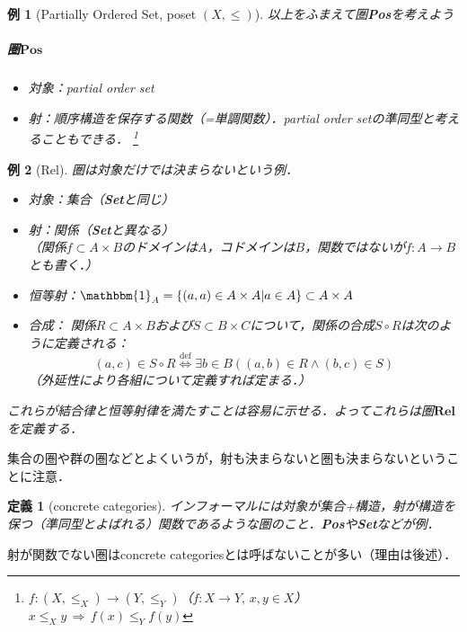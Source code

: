 \documentclass[dvipdfmx,a4j,10pt]{jsarticle}
\theoremstyle{mystyle1}
\theoremstyle{mystyle2}
\newtheorem{dfn*}{定義}
\newtheorem{example}{例}
\newcommand{\defLeftrightarrow}{\overset{\text{def}}{\iff}}
\begin{document}
\begin{example}[Partially Ordered Set, poset $(X,\leq)$]
	以上をふまえて圏\textbf{Pos}を考えよう

	\subparagraph{圏$\mathbf{Pos}$}
	\begin{itemize}
		\item 対象：partial order set
		\item 射：順序構造を保存する関数（=単調関数）．partial order setの準同型と考えることもできる．
		      \footnote{$f:(X,\leq_X)\to (Y,\leq_Y)$（$f:X\to Y,\, x,y\in X$）$x\leq_X y\,\Rightarrow\,f(x)\leq_Y f(y)$}
	\end{itemize}
\end{example}

\begin{example}[Rel]
	圏は対象だけでは決まらないという例．
	\begin{itemize}
		\item 対象：集合（\textbf{Set}と同じ）
		\item 射：関係（\textbf{Set}と異なる）\\
		      （関係$f\subset A\times B$のドメインは$A$，コドメインは$B$，関数ではないが$f:A\to B$とも書く．）
		\item 恒等射：$\mathbbm{1}_A=\{(a,a)\in A\times A| a\in A\}\subset A\times A$
		\item 合成：
		      関係$R\subset A\times B$および$S\subset B\times C$について，関係の合成$S\circ R$は次のように定義される：
		      \[
			      (a,c)\in S\circ R \defLeftrightarrow \exists b\in B((a,b)\in R\land (b,c)\in S)
		      \]
		      （外延性により各組について定義すれば定まる．）
	\end{itemize}
	これらが結合律と恒等射律を満たすことは容易に示せる．よってこれらは圏$\mathbf{Rel}$を定義する．
\end{example}

集合の圏や群の圏などとよくいうが，射も決まらないと圏も決まらないということに注意．

\begin{dfn*}[concrete categories]
	インフォーマルには対象が集合+構造，射が構造を保つ（準同型とよばれる）関数であるような圏のこと．\textbf{Pos}や\textbf{Set}などが例．
\end{dfn*}

射が関数でない圏はconcrete categoriesとは呼ばないことが多い（理由は後述）．
\end{document}
